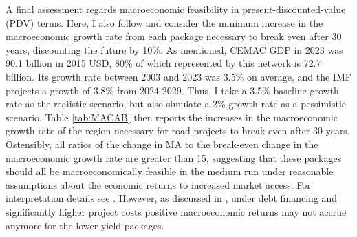 \documentclass[a4paper]{article}
\begin{document}
A final assessment regards macroeconomic feasibility in present-discounted-value (PDV) terms. Here, I also follow \citet{krantz2024optimal} and consider the minimum increase in the macroeconomic growth rate from each package necessary to break even after 30 years, discounting the future by 10\%. As mentioned, CEMAC GDP in 2023 was 90.1 billion in 2015 USD, 80\% of which represented by this network is 72.7 billion. Its growth rate between 2003 and 2023 was 3.5\% on average, and the IMF projects a growth of 3.8\% from 2024-2029. Thus, I take a 3.5\% baseline growth rate as the realistic scenario, but also simulate a 2\% growth rate as a pessimistic scenario. Table \ref{tab:MACAB} then reports the increases in the macroeconomic growth rate of the region necessary for road projects to break even after 30 years. Ostensibly, all ratios of the change in MA to the break-even change in the macroeconomic growth rate are greater than 15, suggesting that these packages should all be macroeconomically feasible in the medium run under reasonable assumptions about the economic returns to increased market access. For interpretation details see \citet{krantz2024optimal}. However, as discussed in \citet{krantz2024optimal}, under debt financing and significantly higher project costs positive macroeconomic returns may not accrue anymore for the lower yield packages.  
\end{document}
